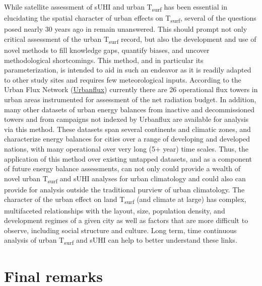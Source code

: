 \begin{bibunit}
While satellite assessment of sUHI and urban T\textsubscript{surf} has been essential in elucidating the spatial character of urban effects on T\textsubscript{surf}, several of the questions posed nearly 30 years ago in \citet{Roth1989} remain unanswered. This should prompt not only critical assessment of the urban T\textsubscript{surf} record, but also the development and use of novel methods to fill knowledge gaps, quantify biases, and uncover methodological shortcomings. This method, and in particular its parameterization, is intended to aid in such an endeavor as it is readily adapted to other study sites and requires few meteorological inputs. According to the Urban Flux Network (\href{http://fluxnet.fluxdata.org/}{Urbanflux}) currently there are 26 operational flux towers in urban areas instrumented for assessment of the net radiation budget. In addition, many other datasets of urban energy balances from inactive and decommissioned towers and from campaigns not indexed by Urbanflux are available for analysis via this method. These datasets span several continents and climatic zones, and characterize energy balances for cities over a range of developing and developed nations, with many operational over very long (5+ year) time scales. Thus, the application of this method over existing untapped datasets, and as a component of future energy balance assessments, can not only could provide a wealth of novel urban T\textsubscript{surf} and sUHI analyses for urban climatology and could also can provide for analysis outside the traditional purview of urban climatology. The character of the urban effect on land T\textsubscript{surf} (and climate at large) has complex, multifaceted relationships with the layout, size, population density, and development regimes of a given city as well as factors that are more difficult to observe, including social structure and culture. Long term, time continuous analysis of urban T\textsubscript{surf} and sUHI can help to better understand these links. 

\section{Final remarks}



\end{bibunit}
